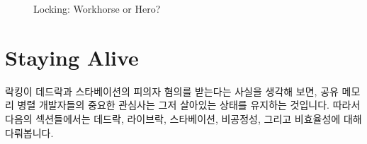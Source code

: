 \begin{figure}[tb]
\begin{center}
\end{center}
\caption{Locking: Workhorse or Hero?}
\end{figure}

\section{Staying Alive}
\label{sec:locking:Staying Alive}

락킹이 데드락과 스타베이션의 피의자 혐의를 받는다는 사실을 생각해 보면, 공유
메모리 병렬 개발자들의 중요한 관심사는 그저 살아있는 상태를 유지하는 것입니다.
따라서 다음의 섹션들에서는 데드락, 라이브락, 스타베이션, 비공정성, 그리고
비효율성에 대해 다뤄봅니다.


